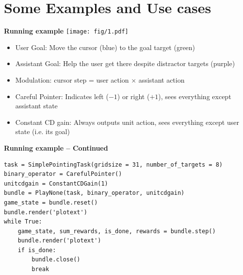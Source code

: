 \documentclass[11pt, xcolor = {dvipsnames}]{beamer}
\begin{document}
\section{Some Examples and Use cases}

\begin{frame}{\textbf{Running example}}
\texttt{[image: fig/1.pdf]} 
\begin{itemize}
\item User Goal:  Move the cursor (blue) to the goal target (green)
\item Assistant Goal: Help the user get there despite distractor targets (purple)
\item Modulation: cursor step = user action $\times$ assistant action
\item Careful Pointer: Indicates left ($-1$) or right ($+1$), sees everything except assistant state
\item Constant CD gain: Always outputs unit action, sees everything except user state (i.e. its goal)
\end{itemize}
\end{frame}


\begin{frame}[fragile]{\textbf{Running example -- Continued}}
\begin{adjustbox}{width=\textwidth}\lstset{language=Python}
\lstset{frame=lines}
\lstset{basicstyle=\footnotesize}
\begin{lstlisting}
task = SimplePointingTask(gridsize = 31, number_of_targets = 8)
binary_operator = CarefulPointer()
unitcdgain = ConstantCDGain(1)
bundle = PlayNone(task, binary_operator, unitcdgain)
game_state = bundle.reset()
bundle.render('plotext')
while True:
    game_state, sum_rewards, is_done, rewards = bundle.step()
    bundle.render('plotext')
    if is_done:
        bundle.close()
        break
\end{lstlisting}
\end{adjustbox}
\end{frame}
\end{document}
